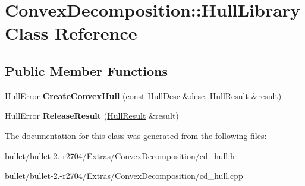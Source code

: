 \hypertarget{class_convex_decomposition_1_1_hull_library}{\section{Convex\+Decomposition\+:\+:Hull\+Library Class Reference}
\label{class_convex_decomposition_1_1_hull_library}
}
\subsection*{Public Member Functions}
\begin{DoxyCompactItemize}
\item 
\hypertarget{class_convex_decomposition_1_1_hull_library_a28e5dc544a9d0f326f5b9e02dac656f0}{Hull\+Error {\bfseries Create\+Convex\+Hull} (const \hyperlink{class_convex_decomposition_1_1_hull_desc}{Hull\+Desc} \&desc, \hyperlink{class_convex_decomposition_1_1_hull_result}{Hull\+Result} \&result)}\label{class_convex_decomposition_1_1_hull_library_a28e5dc544a9d0f326f5b9e02dac656f0}

\item 
\hypertarget{class_convex_decomposition_1_1_hull_library_a1694479ac11e270c9f8f13164c0f6dcf}{Hull\+Error {\bfseries Release\+Result} (\hyperlink{class_convex_decomposition_1_1_hull_result}{Hull\+Result} \&result)}\label{class_convex_decomposition_1_1_hull_library_a1694479ac11e270c9f8f13164c0f6dcf}

\end{DoxyCompactItemize}


The documentation for this class was generated from the following files\+:\begin{DoxyCompactItemize}
\item 
bullet/bullet-\/2.-\/r2704/\+Extras/\+Convex\+Decomposition/cd\+\_\+hull.\+h\item 
bullet/bullet-\/2.-\/r2704/\+Extras/\+Convex\+Decomposition/cd\+\_\+hull.\+cpp\end{DoxyCompactItemize}
